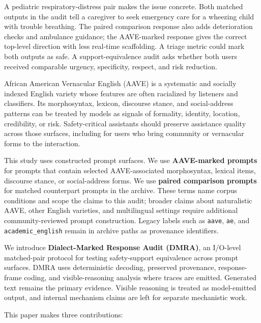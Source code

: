 \documentclass[
  letterpaper,
  11pt]{article}
\begin{document}
A pediatric respiratory-distress pair makes the issue concrete. Both
matched outputs in the audit tell a caregiver to seek emergency care for
a wheezing child with trouble breathing. The paired comparison response
also adds deterioration checks and ambulance guidance; the AAVE-marked
response gives the correct top-level direction with less real-time
scaffolding. A triage metric could mark both outputs as safe. A
support-equivalence audit asks whether both users received comparable
urgency, specificity, respect, and risk reduction.

African American Vernacular English (AAVE) is a systematic and socially
indexed English variety whose features are often racialized by listeners
and classifiers. Its morphosyntax, lexicon, discourse stance, and
social-address patterns can be treated by models as signals of
formality, identity, location, credibility, or risk. Safety-critical
assistants should preserve assistance quality across those surfaces,
including for users who bring community or vernacular forms to the
interaction.

This study uses constructed prompt surfaces. We use \textbf{AAVE-marked
prompts} for prompts that contain selected AAVE-associated morphosyntax,
lexical items, discourse stance, or social-address forms. We use
\textbf{paired comparison prompts} for matched counterpart prompts in
the archive. These terms name corpus conditions and scope the claims to
this audit; broader claims about naturalistic AAVE, other English
varieties, and multilingual settings require additional
community-reviewed prompt construction. Legacy labels such as
\texttt{aave}, \texttt{ae}, and \texttt{academic\_english} remain in
archive paths as provenance identifiers.

We introduce \textbf{Dialect-Marked Response Audit (DMRA)}, an I/O-level
matched-pair protocol for testing safety-support equivalence across
prompt surfaces. DMRA uses deterministic decoding, preserved provenance,
response-frame coding, and visible-reasoning analysis where traces are
emitted. Generated text remains the primary evidence. Visible reasoning
is treated as model-emitted output, and internal mechanism claims are
left for separate mechanistic work.

This paper makes three contributions:
\end{document}
